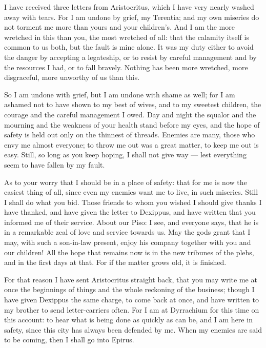 

 I have received three letters from Aristocritus, which I have very nearly washed away with tears. For I am undone by grief, my Terentia; and my own miseries do not torment me more than yours and your children's. And I am the more wretched in this than you, the most wretched of all: that the calamity itself is common to us both, but the fault is mine alone. It was my duty either to avoid the danger by accepting a legateship, or to resist by careful management and by the resources I had, or to fall bravely. Nothing has been more wretched, more disgraceful, more unworthy of us than this.

 So I am undone with grief, but I am undone with shame as well; for I am ashamed not to have shown to my best of wives, and to my sweetest children, the courage and the careful management I owed. Day and night the squalor and the mourning and the weakness of your health stand before my eyes, and the hope of safety is held out only on the thinnest of threads. Enemies are many, those who envy me almost everyone; to throw me out was a great matter, to keep me out is easy. Still, so long as you keep hoping, I shall not give way --- lest everything seem to have fallen by my fault.

 As to your worry that I should be in a place of safety: that for me is now the easiest thing of all, since even my enemies want me to live, in such miseries. Still I shall do what you bid. Those friends to whom you wished I should give thanks I have thanked, and have given the letter to Dexippus, and have written that you informed me of their service. About our Piso: I see, and everyone says, that he is in a remarkable zeal of love and service towards us. May the gods grant that I may, with such a son-in-law present, enjoy his company together with you and our children! All the hope that remains now is in the new tribunes of the plebs, and in the first days at that. For if the matter grows old, it is finished.

 For that reason I have sent Aristocritus straight back, that you may write me at once the beginnings of things and the whole reckoning of the business; though I have given Dexippus the same charge, to come back at once, and have written to my brother to send letter-carriers often. For I am at Dyrrachium for this time on this account: to hear what is being done as quickly as can be, and I am here in safety, since this city has always been defended by me. When my enemies are said to be coming, then I shall go into Epirus.


